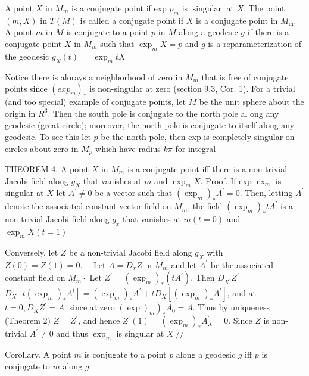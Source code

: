 \documentclass[10pt]{article}
\begin{document}
A point $X$ in $M_{m}$ is a conjugate point if exp $p_{m}$ is $\operatorname{singular}$ at $X .$ The point $(m, X)$ in $T(M)$ is called a conjugate point if $X$ is a conjugate point in $M_{\mathrm{m}} .$ A point $m$ in $M$ is conjugate to a point $p$ in $M$ along a geodesic $g$ if there is a conjugate point $X$ in $M_{m}$ such that $\exp _{m} X=p$ and $g$ is a reparameterization of the geodesic $g_{X}(t)=$ $\exp _{m} t X$

Notice there is alorays a neighborhood of zero in $M_{m}$ that is free of conjugate points since $\left(e x p_{m}\right)_{*}$ is non-singular at zero (section 9.3, Cor. 1). For a trivial (and too special) example of conjugate points, let $M$ be the unit sphere about the origin in $R^{3}$. Then the south pole is conjugate to the north pole al ong any geodesic (great circle); moreover, the north pole is conjugate to itself along any geodesic. To see this let $p$ be the north pole, then exp is completely singular on circles about zero in $M_{p}$ which have radius $k \pi$ for integral

THEOREM 4. A point $X$ in $M_{m}$ is a conjugate point iff there is a non-trivial Jacobi field along $g_{X}$ that vanishes at $m$ and $\exp _{m} X$. Proof. If exp $\operatorname{ex}_{m}$ is singular at $X$ let $A^{\prime} \neq 0$ be a vector such that $\left(\exp _{m}\right)_{*} A^{\prime}=0$. Then, letting $A^{\prime}$ denote the associated constant vector field on $M_{m}$, the field $\left(\exp _{m}\right)_{*} t A^{\prime}$ is a non-trivial Jacobi field along $g_{x}$ that vanishes at $m(t=0)$ and $\exp _{m} X(t=1)$

Conversely, let $Z$ be a non-trivial Jacobi field along $g_{X}$ with $Z(0)=Z(1)=0 . \quad$ Let $A=D_{x} Z$ in $M_{m}$ and let $A^{\prime}$ be the associated constant field on $M_{m} \cdot$ Let $Z^{\prime}=\left(\exp _{m}\right)_{*}\left(t A^{\prime}\right)$. Then $D_{X^{\prime}} Z^{\prime}=$ $D_{X}\left[t\left(\exp _{m}\right)_{*} A^{t}\right]=\left(\exp _{m}\right)_{*} A^{\prime}+t D_{X}\left[\left(\exp _{m}\right)_{*} A^{\prime}\right]$, and at $t=0, D_{X} Z^{\prime}=A^{\prime}$ since at zero $\left.(\exp )_{m}\right)_{*} A_{0}^{\prime}=A$. Thus by uniqueness (Theorem 2) $Z=Z^{\prime}$, and hence $Z^{\prime}(1)=\left(\exp _{m}\right)_{*} A_{X}^{\prime}=0$. Since $Z$ is non-trivial $A^{\prime} \neq 0$ and thus $\exp _{m}$ is singular at $X_{.} / /$

Corollary. A point $m$ is conjugate to a point $p$ along a geodesic $g$ iff $p$ is conjugate to $m$ along $g$.
\end{document}

